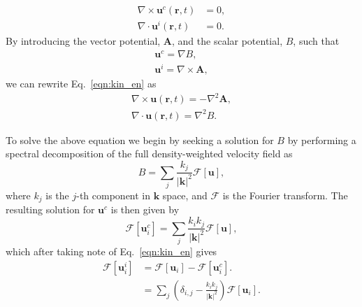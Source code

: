 \begin{subequations}\label{eqn:kinterms}
\begin{align}
    \nabla \times \mathbf{u}^c(\mathbf{r},t) &= 0, \\
    \nabla \cdot \mathbf{u}^i(\mathbf{r},t) &= 0.
\end{align}
\end{subequations}
By introducing the vector potential, $\mathbf{A}$, and the scalar potential, $B$, such that
\begin{subequations}
\begin{align}
    \mathbf{u}^c = \nabla B, \\
    \mathbf{u}^i = \nabla \times \mathbf{A},
\end{align}
\end{subequations}
we can rewrite Eq.~\eqref{eqn:kin_en} as
\begin{align}
    \nabla \times \mathbf{u}(\mathbf{r},t) = -\nabla^2 \mathbf{A}, \\
    \nabla \cdot \mathbf{u}(\mathbf{r},t) = \nabla^2 {B}.
\end{align}

To solve the above equation we begin by seeking a solution for $B$ by performing a spectral decomposition of the full density-weighted velocity field as
\begin{equation}
    B = \displaystyle\sum\limits_{j} \frac{k_j}{|\mathbf{k}|^2}\mathscr{F}[\mathbf{u}],
\end{equation}
where $k_j$ is the $j$-th component in $\mathbf{k}$ space, and $\mathscr{F}$ is the Fourier transform. The resulting solution for $\mathbf{u}^c$ is then given by
\begin{equation}
    \mathscr{F}[\mathbf{u}_i^c] = \displaystyle\sum\limits_{j} \frac{k_i k_j}{|\mathbf{k}|^2} \mathscr{F}[\mathbf{u}],
\end{equation}
which after taking note of Eq.~\eqref{eqn:kin_en} gives
\begin{align}
    \mathscr{F}[\mathbf{u}_i^i] &= \mathscr{F}[\mathbf{u}_i] - \mathscr{F}[\mathbf{u}_i^c]. \\
    &= \displaystyle\sum\limits_{j}\left(\delta_{i,j} - \frac{k_ik_j}{|\mathbf{k}|^2}\right)\mathscr{F}[\mathbf{u}_i]. \nonumber
\end{align}

